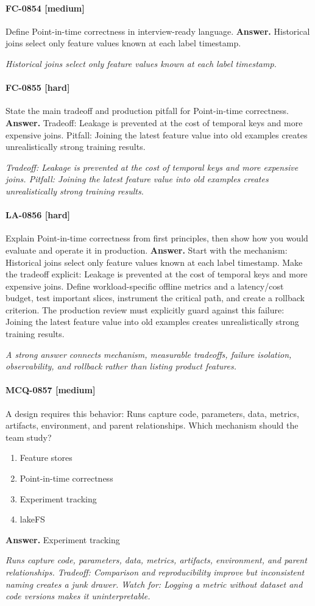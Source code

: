 \paragraph{FC-0854 [medium]} Define Point-in-time correctness in interview-ready language.
\noindent\textbf{Answer.} Historical joins select only feature values known at each label timestamp.
\par\textit{Historical joins select only feature values known at each label timestamp.}
\paragraph{FC-0855 [hard]} State the main tradeoff and production pitfall for Point-in-time correctness.
\noindent\textbf{Answer.} Tradeoff: Leakage is prevented at the cost of temporal keys and more expensive joins. Pitfall: Joining the latest feature value into old examples creates unrealistically strong training results.
\par\textit{Tradeoff: Leakage is prevented at the cost of temporal keys and more expensive joins. Pitfall: Joining the latest feature value into old examples creates unrealistically strong training results.}
\paragraph{LA-0856 [hard]} Explain Point-in-time correctness from first principles, then show how you would evaluate and operate it in production.
\noindent\textbf{Answer.} Start with the mechanism: Historical joins select only feature values known at each label timestamp. Make the tradeoff explicit: Leakage is prevented at the cost of temporal keys and more expensive joins. Define workload-specific offline metrics and a latency/cost budget, test important slices, instrument the critical path, and create a rollback criterion. The production review must explicitly guard against this failure: Joining the latest feature value into old examples creates unrealistically strong training results.
\par\textit{A strong answer connects mechanism, measurable tradeoffs, failure isolation, observability, and rollback rather than listing product features.}
\paragraph{MCQ-0857 [medium]} A design requires this behavior: Runs capture code, parameters, data, metrics, artifacts, environment, and parent relationships. Which mechanism should the team study?
\begin{enumerate}[label=\Alph*.]
\item Feature stores
\item Point-in-time correctness
\item Experiment tracking
\item lakeFS
\end{enumerate}
\noindent\textbf{Answer.} Experiment tracking
\par\textit{Runs capture code, parameters, data, metrics, artifacts, environment, and parent relationships. Tradeoff: Comparison and reproducibility improve but inconsistent naming creates a junk drawer. Watch for: Logging a metric without dataset and code versions makes it uninterpretable.}
